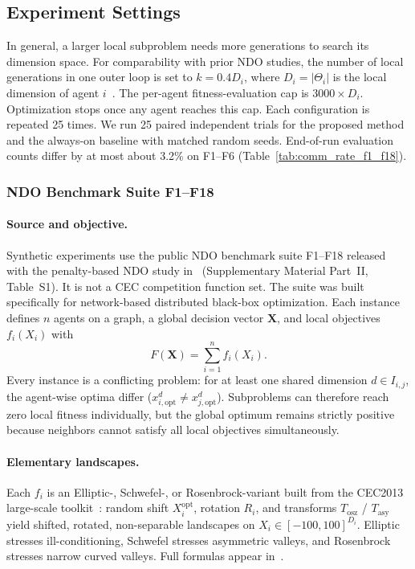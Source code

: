 \documentclass[conference]{IEEEtran}
\begin{document}
\subsection{Experiment Settings}\label{sec:exp_setup}
In general, a larger local subproblem needs more generations to search its dimension space. For comparability with prior NDO studies, the number of local generations in one outer loop is set to $k=0.4D_i$, where $D_i=|\Theta_i|$ is the local dimension of agent $i$~\cite{ref_macpo}. The per-agent fitness-evaluation cap is $3000\times D_i$. Optimization stops once any agent reaches this cap. Each configuration is repeated 25 times. We run 25 paired independent trials for the proposed method and the always-on baseline with matched random seeds. End-of-run evaluation counts differ by at most about 3.2\% on F1--F6 (Table~\ref{tab:comm_rate_f1_f18}).

\subsubsection{NDO Benchmark Suite F1--F18}\label{sec:benchmark_suite}
\paragraph{Source and objective.} Synthetic experiments use the public NDO benchmark suite F1--F18 released with the penalty-based NDO study in~\cite{ref_macpo} (Supplementary Material Part~II, Table~S1). It is not a CEC competition function set. The suite was built specifically for network-based distributed black-box optimization. Each instance defines $n$ agents on a graph, a global decision vector $\mathbf{X}$, and local objectives $f_i(X_i)$ with
\begin{equation}
F(\mathbf{X})=\sum_{i=1}^{n} f_i(X_i).
\label{eq:benchmark_global}
\end{equation}
Every instance is a conflicting problem: for at least one shared dimension $d\in I_{i,j}$, the agent-wise optima differ ($x^d_{i,\mathrm{opt}}\neq x^d_{j,\mathrm{opt}}$). Subproblems can therefore reach zero local fitness individually, but the global optimum remains strictly positive because neighbors cannot satisfy all local objectives simultaneously.

\paragraph{Elementary landscapes.} Each $f_i$ is an Elliptic-, Schwefel-, or Rosenbrock-variant built from the CEC2013 large-scale toolkit~\cite{ref_cec2013}: random shift $X_i^{\mathrm{opt}}$, rotation $R_i$, and transforms $T_{\mathrm{osz}}$ / $T_{\mathrm{asy}}$ yield shifted, rotated, non-separable landscapes on $X_i\in[-100,100]^{D_i}$. Elliptic stresses ill-conditioning, Schwefel stresses asymmetric valleys, and Rosenbrock stresses narrow curved valleys. Full formulas appear in~\cite{ref_macpo}.
\end{document}
